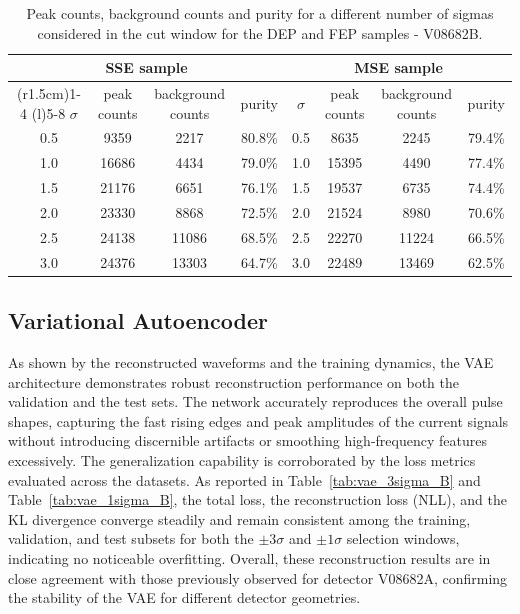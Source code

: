 \begin{table}[H]
    \centering
    \begin{tabular}{cccc @{\hspace{1.5cm}} cccc}
        \toprule
        \multicolumn{4}{c}{SSE sample} & \multicolumn{4}{c}{MSE sample} \\
        \cmidrule(r{1.5cm}){1-4} \cmidrule(l){5-8}
        $\sigma$ & peak counts & background counts & purity & $\sigma$ & peak counts & background counts & purity \\
        \midrule
        0.5 &  9359 &  2217 & 80.8\% & 0.5 &  8635 &  2245 & 79.4\% \\
        1.0 & 16686 &  4434 & 79.0\% & 1.0 & 15395 &  4490 & 77.4\% \\
        1.5 & 21176 &  6651 & 76.1\% & 1.5 & 19537 &  6735 & 74.4\% \\
        2.0 & 23330 &  8868 & 72.5\% & 2.0 & 21524 &  8980 & 70.6\% \\
        2.5 & 24138 & 11086 & 68.5\% & 2.5 & 22270 & 11224 & 66.5\% \\
        3.0 & 24376 & 13303 & 64.7\% & 3.0 & 22489 & 13469 & 62.5\% \\
        \bottomrule
    \end{tabular}
    \caption{Peak counts, background counts and purity for a different number of sigmas considered in the cut window for the \ac{DEP} and \ac{FEP} samples - V08682B.}
    \label{tab:sse_mse_counts-V08682B}
\end{table}

\subsection{Variational Autoencoder}

As shown by the reconstructed waveforms and the training dynamics, the \ac{VAE} architecture demonstrates robust reconstruction performance on both the validation and the test sets. The network accurately reproduces the overall pulse shapes, capturing the fast rising edges and peak amplitudes of the current signals without introducing discernible artifacts or smoothing high-frequency features excessively. The generalization capability is corroborated by the loss metrics evaluated across the datasets. As reported in Table~\ref{tab:vae_3sigma_B} and Table~\ref{tab:vae_1sigma_B}, the total loss, the reconstruction loss (\ac{NLL}), and the \ac{KL} divergence converge steadily and remain consistent among the training, validation, and test subsets for both the $\pm 3\sigma$ and $\pm 1\sigma$ selection windows, indicating no noticeable overfitting. Overall, these reconstruction results are in close agreement with those previously observed for detector V08682A, confirming the stability of the \ac{VAE} for different detector geometries.

